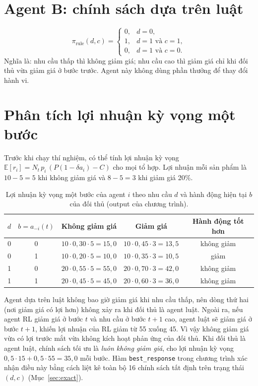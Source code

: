 \documentclass[12pt,a4paper]{report}
\begin{document}
\section{Agent B: chính sách dựa trên luật}
\begin{equation}
\pi_{\text{rule}}(d,c)=\begin{cases}0,& d=0,\\ 1,& d=1\text{ và }c=1,\\ 0,& d=1\text{ và }c=0.\end{cases}
\end{equation}
Nghĩa là: nhu cầu thấp thì không giảm giá; nhu cầu cao thì giảm giá chỉ khi đối thủ
vừa giảm giá ở bước trước. Agent này không dùng phần thưởng để thay đổi hành vi.

\section{Phân tích lợi nhuận kỳ vọng một bước}
Trước khi chạy thí nghiệm, có thể tính lợi nhuận kỳ vọng
$\mathbb E[r_i]=N_t\,p_i\,(P(1-\delta a_i)-C)$ cho mọi tổ hợp. Lợi nhuận mỗi sản
phẩm là $10-5=5$ khi không giảm giá và $8-5=3$ khi giảm giá 20\%.

\begin{table}[H]
\centering
\small
\caption{Lợi nhuận kỳ vọng một bước của agent $i$ theo nhu cầu $d$ và hành động hiện tại $b$ của đối thủ (output của chương trình).}
\label{tab:onestep}
\begin{tabular}{ccccc}
\toprule
$d$ & $b=a_{-i}(t)$ & Không giảm giá & Giảm giá & Hành động tốt hơn \\
\midrule
0 & 0 & $10\cdot0{,}30\cdot5=15{,}0$ & $10\cdot0{,}45\cdot3=13{,}5$ & không giảm \\
0 & 1 & $10\cdot0{,}20\cdot5=10{,}0$ & $10\cdot0{,}35\cdot3=10{,}5$ & giảm \\
1 & 0 & $20\cdot0{,}55\cdot5=55{,}0$ & $20\cdot0{,}70\cdot3=42{,}0$ & không giảm \\
1 & 1 & $20\cdot0{,}45\cdot5=45{,}0$ & $20\cdot0{,}60\cdot3=36{,}0$ & không giảm \\
\bottomrule
\end{tabular}
\end{table}

Agent dựa trên luật không bao giờ giảm giá khi nhu cầu thấp, nên dòng thứ hai
(nơi giảm giá có lợi hơn) không xảy ra khi đối thủ là agent luật. Ngoài ra, nếu
agent RL giảm giá ở bước $t$ và nhu cầu ở bước $t+1$ cao, agent luật sẽ giảm giá ở
bước $t+1$, khiến lợi nhuận của RL giảm từ 55 xuống 45. Vì vậy không giảm giá vừa có
lợi trước mắt vừa không kích hoạt phản ứng của đối thủ. Khi đối thủ là agent luật,
chính sách tối ưu là \emph{luôn không giảm giá}, cho lợi nhuận kỳ vọng
$0{,}5\cdot15+0{,}5\cdot55=35{,}0$ mỗi bước. Hàm \texttt{best\_response} trong
chương trình xác nhận điều này bằng cách liệt kê toàn bộ 16 chính sách tất định
trên trạng thái $(d,c)$ (Mục~\ref{sec:exact}).
\end{document}
